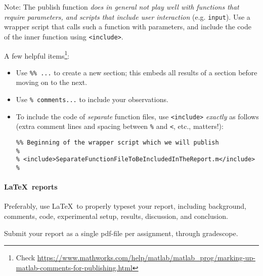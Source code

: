 \documentclass[11pt,letter]{article}
\begin{document}
Note: The publish function \emph{does in general not play well with functions that require parameters, and scripts that include user interaction} (e.g. \texttt{input}). Use a wrapper script that calls such a function with parameters, and include the code of the inner function using \texttt{<include>}.

A few helpful items\footnote{Check \url{https://www.mathworks.com/help/matlab/matlab_prog/marking-up-matlab-comments-for-publishing.html}}:
\begin{itemize}
\item Use \verb|%% ...| to create a new section; this embeds all results of a section before moving on to the next.
\item Use \verb|% comments...| to include your observations.
\item To include the code of \emph{separate} function files, use \texttt{<include>} \emph{exactly} as follows (extra comment lines and spacing between \verb|%| and \verb|<|, etc., matters!):
\begin{verbatim}
%% Beginning of the wrapper script which we will publish
%
% <include>SeparateFunctionFileToBeIncludedInTheReport.m</include>
%
\end{verbatim}
\end{itemize}

\paragraph{\LaTeX\ reports}
Preferably, use \LaTeX\ to properly typeset your report, including background, comments, code, experimental setup, results, discussion, and conclusion.

Submit your report as a single pdf-file per assignment, through gradescope.
\end{document}
